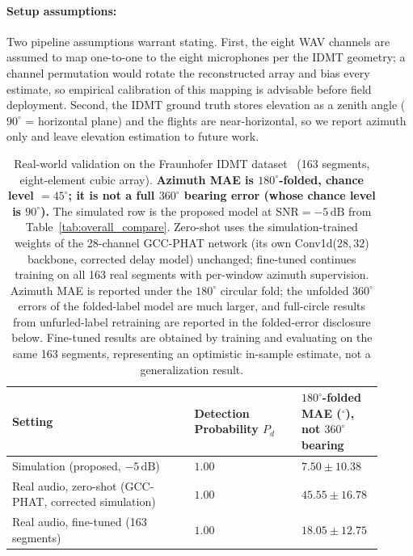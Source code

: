 \documentclass[sensors,article,submit,pdftex,moreauthors]{Definitions/mdpi}
\begin{document}
\paragraph{Setup assumptions:}
Two pipeline assumptions warrant stating. First, the eight WAV channels are assumed to map one-to-one to the eight microphones per the IDMT geometry; a channel permutation would rotate the reconstructed array and bias every estimate, so empirical calibration of this mapping is advisable before field deployment. Second, the IDMT ground truth stores elevation as a zenith angle ($90^\circ$ = horizontal plane) and the flights are near-horizontal, so we report azimuth only and leave elevation estimation to future work.

\begin{table}[H]
\renewcommand{\arraystretch}{1.2}
\caption{Real-world validation on the Fraunhofer IDMT dataset~\cite{idmt2025drone} (163 segments, eight-element cubic array). \textbf{Azimuth MAE is $180^\circ$-folded, chance level $=45^\circ$; it is not a full $360^\circ$ bearing error (whose chance level is $90^\circ$).} The simulated row is the proposed model at $\mathrm{SNR}=-5\,\mathrm{dB}$ from Table~\ref{tab:overall_compare}. Zero-shot uses the simulation-trained weights of the 28-channel GCC-PHAT network (its own Conv1d($28,32$) backbone, corrected delay model) unchanged; fine-tuned continues training on all 163 real segments with per-window azimuth supervision. Azimuth MAE is reported under the $180^\circ$ circular fold; the unfolded $360^\circ$ errors of the folded-label model are much larger, and full-circle results from unfurled-label retraining are reported in the folded-error disclosure below. Fine-tuned results are obtained by training and evaluating on the same 163 segments, representing an optimistic in-sample estimate, not a generalization result.}
\label{tab:real}
\centering
\setlength{\tabcolsep}{4pt}
\begin{tabular}{p{0.46\linewidth}p{0.27\linewidth}p{0.18\linewidth}}
\toprule
Setting & Detection Probability $P_d$ & \textbf{$180^\circ$-folded MAE ($^\circ$), not $360^\circ$ bearing} \\
\midrule
Simulation (proposed, $-5\,\mathrm{dB}$) & $1.00$ & $7.50\pm10.38$ \\
Real audio, zero-shot (GCC-PHAT, corrected simulation) & $1.00$ & $45.55\pm16.78$ \\
Real audio, fine-tuned (163 segments) & $1.00$ & $\mathbf{18.05\pm12.75}$ \\
\bottomrule
\end{tabular}
\end{table}
\end{document}
